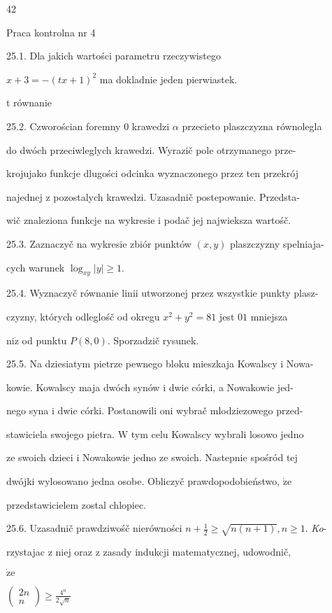 \documentclass[a4paper,12pt]{article}
\begin{document}
42

Praca kontrolna nr 4

25.1. Dla jakich wartości parametru rzeczywistego

$x+3=-(tx+1)^{2}$ ma dokladnie jeden pierwiastek.

t równanie

25.2. Czworościan foremny $0$ krawedzi $\alpha$ przecieto plaszczyzna równolegla

do dwóch przeciwleglych krawedzi. Wyrazič pole otrzymanego prze-

krojujako funkcje dlugości odcinka wyznaczonego przez ten przekrój

najednej $\mathrm{z}$ pozostalych krawedzi. Uzasadnič postepowanie. Przedsta-

wič znaleziona funkcje na wykresie $\mathrm{i}$ podač jej najwieksza wartośč.

25.3. Zaznaczyč na wykresie zbiór punktów $(x,y)$ plaszczyzny spelniaja-

cych warunek $\log_{xy}|y|\geq 1.$

25.4. Wyznaczyč równanie linii utworzonej przez wszystkie punkty plasz-

czyzny, których odleglośč od okregu $x^{2}+y^{2}=81$ jest $01$ mniejsza

$\mathrm{n}\mathrm{i}\dot{\mathrm{z}}$ od punktu $P(8,0)$. Sporzadzič rysunek.

25.5. Na dziesiatym pietrze pewnego bloku mieszkaja Kowalscy $\mathrm{i}$ Nowa-

kowie. Kowalscy maja dwóch synów $\mathrm{i}$ dwie córki, a Nowakowie jed-

nego syna $\mathrm{i}$ dwie córki. Postanowili oni wybrač mlodziezowego przed-

stawiciela swojego pietra. $\mathrm{W}$ tym celu Kowalscy wybrali losowo jedno

ze swoich dzieci $\mathrm{i}$ Nowakowie jedno ze swoich. Nastepnie spośród tej

dwójki wylosowano jedna osobe. Obliczyč prawdopodobieństwo, $\dot{\mathrm{z}}\mathrm{e}$

przedstawicielem zostal chlopiec.

25.6. Uzasadnič prawdziwośč nierówności $n+\displaystyle \frac{1}{2}\geq\sqrt{n(n+1)}, n\geq 1.$ {\it Ko}-

rzystajac $\mathrm{z}$ niej oraz $\mathrm{z}$ zasady indukcji matematycznej, udowodnič,

$\dot{\mathrm{z}}\mathrm{e}$

$\displaystyle \left(\begin{array}{l}
2n\\
n
\end{array}\right)\geq\frac{4^{n}}{2\sqrt{n}}$
\end{document}
